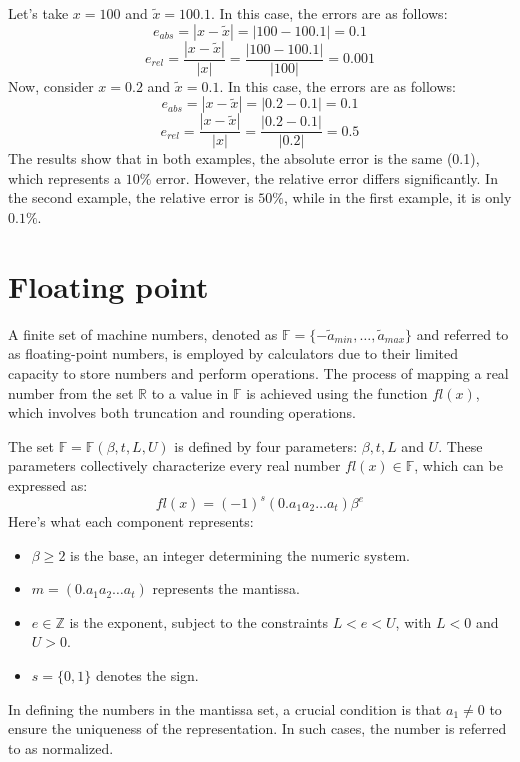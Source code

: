 \documentclass[12pt, a4paper]{report}
\begin{document}
    \begin{example}
        Let's take $x=100$ and $\tilde{x}=100.1$. 
        In this case, the errors are as follows:
        \[e_{abs}=\left\lvert x - \tilde{x} \right\rvert=\left\lvert 100 - 100.1 \right\rvert=0.1\]
        \[e_{rel}=\dfrac{\left\lvert x - \tilde{x} \right\rvert}{\left\lvert x \right\rvert}=\dfrac{\left\lvert 100 - 100.1 \right\rvert}{\left\lvert 100 \right\rvert}=0.001\]
        Now, consider $x=0.2$ and $\tilde{x}=0.1$. 
        In this case, the errors are as follows:
        \[e_{abs}=\left\lvert x - \tilde{x} \right\rvert=\left\lvert 0.2 - 0.1 \right\rvert=0.1\]
        \[e_{rel}=\dfrac{\left\lvert x - \tilde{x} \right\rvert}{\left\lvert x \right\rvert}=\dfrac{\left\lvert 0.2 - 0.1 \right\rvert}{\left\lvert 0.2 \right\rvert}=0.5\]
        The results show that in both examples, the absolute error is the same (0.1), which represents a $10\%$ error. 
        However, the relative error differs significantly.
        In the second example, the relative error is $50\%$, while in the first example, it is only $0.1\%$. 
    \end{example}

    \section{Floating point}
    A finite set of machine numbers, denoted as $\mathbb{F}=\{-\tilde{a}_{min},\dots,\tilde{a}_{max}\}$ and referred to as floating-point numbers, is employed by calculators due to their limited capacity to store numbers and perform operations.
    The process of mapping a real number from the set $\mathbb{R}$ to a value in $\mathbb{F}$ is achieved using the function $fl(x)$, which involves both truncation and rounding operations.

    The set $\mathbb{F}=\mathbb{F}(\beta,t,L,U)$ is defined by four parameters: $\beta,t,L$ and $U$. 
    These parameters collectively characterize every real number $fl(x) \in \mathbb{F}$, which can be expressed as:
    \[fl(x)=(-1)^s(0.a_1a_2\dots a_t)\beta^e\]
    Here's what each component represents:
    \begin{itemize}
        \item $\beta \geq 2$ is the base, an integer determining  the numeric system. 
        \item $m=(0.a_1a_2\dots a_t)$ represents the mantissa.
        \item $e \in \mathbb{Z}$ is the exponent, subject to the constraints $L<e<U$, with $L<0$ and $U>0$. 
        \item $s=\{0,1\}$ denotes the sign.
    \end{itemize}
    In defining the numbers in the mantissa set, a crucial condition is that $a_1 \neq 0$ to ensure the uniqueness of the representation. 
    In such cases, the number is referred to as normalized.
\end{document}
